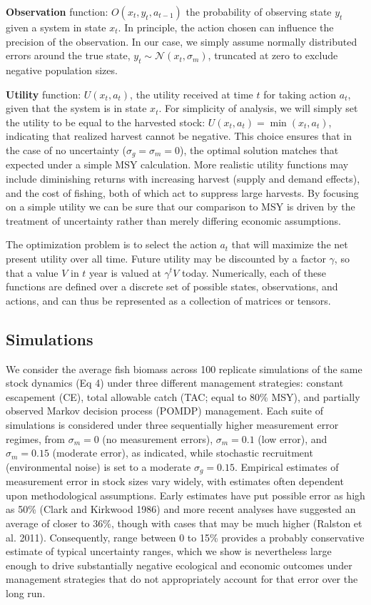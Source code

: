 \documentclass[3p]{elsarticle} %
\begin{document}
\textbf{Observation} function: \(O(x_t,y_t,a_{t-1})\) the probability of
observing state \(y_t\) given a system in state \(x_t\). In principle,
the action chosen can influence the precision of the observation. In our
case, we simply assume normally distributed errors around the true
state, \(y_t \sim \mathcal{N}(x_t, \sigma_m)\), truncated at zero to
exclude negative population sizes.

\textbf{Utility} function: \(U(x_t,a_t)\), the utility received at time
\(t\) for taking action \(a_t\), given that the system is in state
\(x_t\). For simplicity of analysis, we will simply set the utility to
be equal to the harvested stock: \(U(x_t, a_t) = \min(x_t, a_t)\),
indicating that realized harvest cannot be negative. This choice ensures
that in the case of no uncertainty (\(\sigma_g = \sigma_m = 0\)), the
optimal solution matches that expected under a simple MSY calculation.
More realistic utility functions may include diminishing returns with
increasing harvest (supply and demand effects), and the cost of fishing,
both of which act to suppress large harvests. By focusing on a simple
utility we can be sure that our comparison to MSY is driven by the
treatment of uncertainty rather than merely differing economic
assumptions.

The optimization problem is to select the action \(a_t\) that will
maximize the net present utility over all time. Future utility may be
discounted by a factor \(\gamma\), so that a value \(V\) in \(t\) year
is valued at \(\gamma^t V\) today. Numerically, each of these functions
are defined over a discrete set of possible states, observations, and
actions, and can thus be represented as a collection of matrices or
tensors.

\hypertarget{simulations}{%
\subsection{Simulations}\label{simulations}}

We consider the average fish biomass across 100 replicate simulations of
the same stock dynamics (Eq 4) under three different management
strategies: constant escapement (CE), total allowable catch (TAC; equal
to 80\% MSY), and partially observed Markov decision process (POMDP)
management. Each suite of simulations is considered under three
sequentially higher measurement error regimes, from \(\sigma_m = 0\) (no
measurement errors), \(\sigma_m = 0.1\) (low error), and
\(\sigma_m = 0.15\) (moderate error), as indicated, while stochastic
recruitment (environmental noise) is set to a moderate
\(\sigma_g = 0.15\). Empirical estimates of measurement error in stock
sizes vary widely, with estimates often dependent upon methodological
assumptions. Early estimates have put possible error as high as 50\%
(Clark and Kirkwood 1986) and more recent analyses have suggested an
average of closer to 36\%, though with cases that may be much higher
(Ralston et al. 2011). Consequently, range between 0 to 15\% provides a
probably conservative estimate of typical uncertainty ranges, which we
show is nevertheless large enough to drive substantially negative
ecological and economic outcomes under management strategies that do not
appropriately account for that error over the long run.
\end{document}
